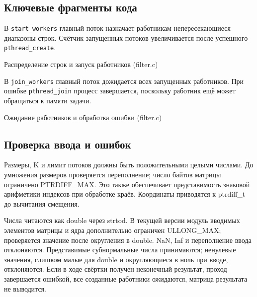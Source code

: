 \documentclass[12pt,a4paper]{article}
\begin{document}
\subsection{Ключевые фрагменты кода}

\noindent\begin{minipage}{\linewidth}
В \texttt{start\_workers} главный поток назначает работникам непересекающиеся диапазоны строк. Счётчик запущенных потоков увеличивается после успешного \texttt{pthread\_create}.

\begin{listingblock}{Распределение строк и запуск работников (filter.c)}
\end{listingblock}
\end{minipage}\par

\noindent\begin{minipage}{\linewidth}
В \texttt{join\_workers} главный поток дожидается всех запущенных работников. При ошибке \texttt{pthread\_join} процесс завершается, поскольку работник ещё может обращаться к памяти задачи.

\begin{listingblock}{Ожидание работников и обработка ошибки (filter.c)}
\end{listingblock}
\end{minipage}\par

\subsection{Проверка ввода и ошибок}

Размеры, K и лимит потоков должны быть положительными целыми числами. До умножения размеров проверяется переполнение; число байтов матрицы ограничено PTRDIFF\_MAX. Это также обеспечивает представимость знаковой арифметики индексов при обработке краёв. Координаты приводятся к ptrdiff\_t до вычитания смещения.

Числа читаются как double через strtod. В текущей версии модуль вводимых элементов матрицы и ядра дополнительно ограничен ULLONG\_MAX; проверяется значение после округления в double. NaN, Inf и переполнение ввода отклоняются. Представимые субнормальные числа принимаются; ненулевые значения, слишком малые для double и округляющиеся в ноль при вводе, отклоняются. Если в ходе свёртки получен неконечный результат, проход завершается ошибкой, все созданные работники ожидаются, матрица результата не выводится.
\end{document}
